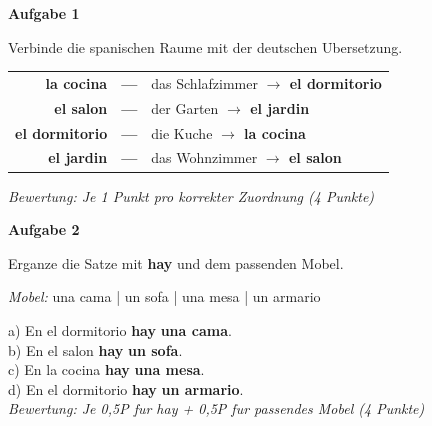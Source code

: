 \documentclass[11pt, a4paper]{article}
\newcommand{\fachfarbe}{spanisch}
\newcommand{\punktebox}[1]{\hfill\fbox{\small \_/#1}}
\newcommand{\loesung}[1]{\textcolor{loesung}{\textbf{#1}}}
\newenvironment{aufgabe}[1]{%
    \needspace{5\baselineskip}%
    \nopagebreak[4]%
    \vspace{10pt}
    \noindent\textbf{\textcolor{\fachfarbe}{Aufgabe #1}}
    \nopagebreak[4]%
    \vspace{5pt}
    \nopagebreak[4]%
    \begin{list}{}{\leftmargin=0pt}
    \item[]
}{%
    \end{list}
}
\newcommand{\es}[1]{\textcolor{\fachfarbe}{\textbf{#1}}}
\begin{document}
\begin{aufgabe}{1}
Verbinde die spanischen Raume mit der deutschen Ubersetzung. \punktebox{4}
\end{aufgabe}

\begin{center}
\begin{tabular}{rcl}
\es{la cocina} & \loesung{---} & das Schlafzimmer \loesung{$\rightarrow$ el dormitorio} \\[0.8em]
\es{el salon} & \loesung{---} & der Garten \loesung{$\rightarrow$ el jardin} \\[0.8em]
\es{el dormitorio} & \loesung{---} & die Kuche \loesung{$\rightarrow$ la cocina} \\[0.8em]
\es{el jardin} & \loesung{---} & das Wohnzimmer \loesung{$\rightarrow$ el salon} \\
\end{tabular}
\end{center}

\textit{\textcolor{grau}{Bewertung: Je 1 Punkt pro korrekter Zuordnung (4 Punkte)}}

\vspace{10pt}


\begin{aufgabe}{2}
Erganze die Satze mit \es{hay} und dem passenden Mobel. \punktebox{4}
\end{aufgabe}

\begin{vokabelkasten}
\textit{Mobel:} una cama | un sofa | una mesa | un armario
\end{vokabelkasten}

\vspace{0.5em}

\noindent
a) En el dormitorio \loesung{hay} \loesung{una cama}. \\[0.8em]
b) En el salon \loesung{hay} \loesung{un sofa}. \\[0.8em]
c) En la cocina \loesung{hay} \loesung{una mesa}. \\[0.8em]
d) En el dormitorio \loesung{hay} \loesung{un armario}. \\

\textit{\textcolor{grau}{Bewertung: Je 0,5P fur hay + 0,5P fur passendes Mobel (4 Punkte)}}

\vspace{10pt}
\end{document}
